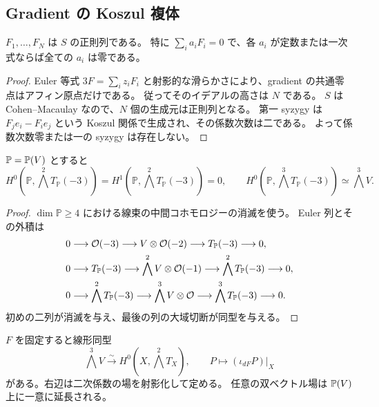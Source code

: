 \subsection{Gradient の Koszul 複体}
\begin{lemma}\label{lem:pg-gradient}
$F_1,\ldots,F_N$ は $S$ の正則列である。
特に $\sum_i a_iF_i=0$ で、各 $a_i$ が定数または一次式ならば全ての $a_i$ は零である。
\end{lemma}
\begin{proof}
Euler 等式 $3F=\sum_i z_iF_i$ と射影的な滑らかさにより、gradient の共通零点はアフィン原点だけである。
従ってそのイデアルの高さは $N$ である。
$S$ は Cohen--Macaulay なので、$N$ 個の生成元は正則列となる。
第一 syzygy は $F_je_i-F_ie_j$ という Koszul 関係で生成され、その係数次数は二である。
よって係数次数零または一の syzygy は存在しない。
\end{proof}
\begin{lemma}\label{lem:pg-euler}
$\mathbb P=\mathbb P(V)$ とすると
\[
H^0(\mathbb P,\textstyle\bigwedge^2 T_{\mathbb P}(-3))
=H^1(\mathbb P,\textstyle\bigwedge^2 T_{\mathbb P}(-3))=0,
\qquad
H^0(\mathbb P,\textstyle\bigwedge^3 T_{\mathbb P}(-3))\simeq\bigwedge^3V.
\]
\end{lemma}
\begin{proof}
$\dim\mathbb P\geq4$ における線束の中間コホモロジーの消滅\cite[Chapter III]{PHartshorne}を使う。
Euler 列とその外積は
\begin{align*}
0&\longrightarrow\mathcal O(-3)\longrightarrow V\otimes\mathcal O(-2)
 \longrightarrow T_{\mathbb P}(-3)\longrightarrow0,\\
0&\longrightarrow T_{\mathbb P}(-3)\longrightarrow\bigwedge^2V\otimes\mathcal O(-1)
 \longrightarrow\bigwedge^2T_{\mathbb P}(-3)\longrightarrow0,\\
0&\longrightarrow\bigwedge^2T_{\mathbb P}(-3)\longrightarrow\bigwedge^3V\otimes\mathcal O
 \longrightarrow\bigwedge^3T_{\mathbb P}(-3)\longrightarrow0.
\end{align*}
初めの二列が消滅を与え、最後の列の大域切断が同型を与える。
\end{proof}
\begin{proposition}\label{prop:pg-represent}
$F$ を固定すると線形同型
\[
\bigwedge^3V\xrightarrow{\sim} H^0(X,\bigwedge^2T_X),
\qquad P\longmapsto(\iota_{dF}P)|_X
\]
がある。右辺は二次係数の場を射影化して定める。
任意の双ベクトル場は $\mathbb P(V)$ 上に一意に延長される。
\end{proposition}
